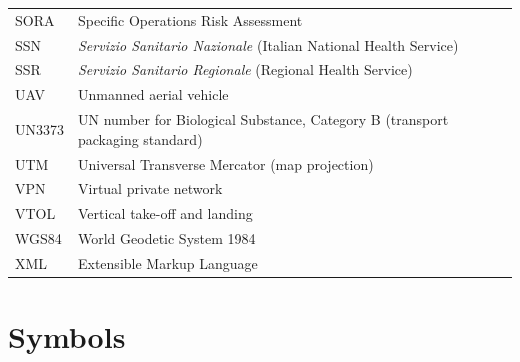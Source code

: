 {\begin{longtable}{L{0.18} L{0.82}}
SORA & Specific Operations Risk Assessment \\
SSN & \textit{Servizio Sanitario Nazionale} (Italian National Health Service) \\
SSR & \textit{Servizio Sanitario Regionale} (Regional Health Service) \\
UAV & Unmanned aerial vehicle \\
UN3373 & UN number for Biological Substance, Category B (transport packaging standard) \\
UTM & Universal Transverse Mercator (map projection) \\
VPN & Virtual private network \\
VTOL & Vertical take-off and landing \\
WGS84 & World Geodetic System 1984 \\
XML & Extensible Markup Language \\
\end{longtable}
}

\section*{Symbols}

